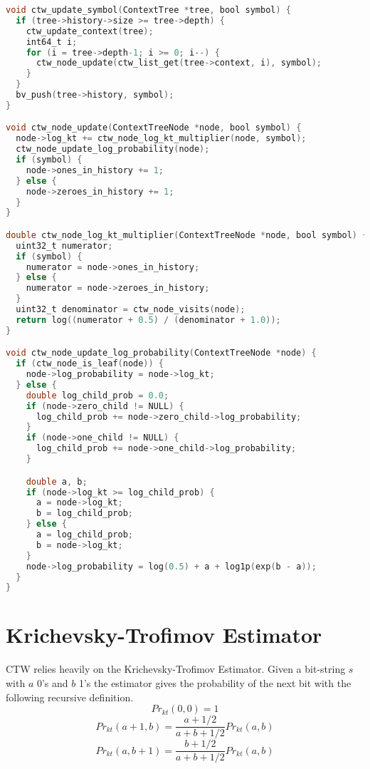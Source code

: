 \documentclass[fancychapters]{report}   	%
\begin{document}
\begin{lstlisting}[language=C]
void ctw_update_symbol(ContextTree *tree, bool symbol) {
  if (tree->history->size >= tree->depth) {
    ctw_update_context(tree);
    int64_t i;
    for (i = tree->depth-1; i >= 0; i--) {
      ctw_node_update(ctw_list_get(tree->context, i), symbol);
    }
  }
  bv_push(tree->history, symbol);
}

void ctw_node_update(ContextTreeNode *node, bool symbol) {
  node->log_kt += ctw_node_log_kt_multiplier(node, symbol);
  ctw_node_update_log_probability(node);
  if (symbol) {
    node->ones_in_history += 1;
  } else {
    node->zeroes_in_history += 1;
  } 
}

double ctw_node_log_kt_multiplier(ContextTreeNode *node, bool symbol) {
  uint32_t numerator;
  if (symbol) {
    numerator = node->ones_in_history;
  } else {
    numerator = node->zeroes_in_history;
  }
  uint32_t denominator = ctw_node_visits(node);
  return log((numerator + 0.5) / (denominator + 1.0));
}

void ctw_node_update_log_probability(ContextTreeNode *node) {
  if (ctw_node_is_leaf(node)) {
    node->log_probability = node->log_kt;
  } else {
    double log_child_prob = 0.0;
    if (node->zero_child != NULL) {
      log_child_prob += node->zero_child->log_probability;
    }
    if (node->one_child != NULL) {
      log_child_prob += node->one_child->log_probability;
    }

    double a, b;
    if (node->log_kt >= log_child_prob) {
      a = node->log_kt;
      b = log_child_prob;
    } else {
      a = log_child_prob;
      b = node->log_kt;
    }
    node->log_probability = log(0.5) + a + log1p(exp(b - a));
  }
}
\end{lstlisting}


\section{Krichevsky-Trofimov Estimator}
CTW relies heavily on the Krichevsky-Trofimov Estimator. Given a bit-string $s$ with $a$ 0's and $b$ 1's the estimator gives the probability of the next bit with the following recursive definition.
\begin{equation}
    Pr_{kt}(0,0) = 1
\end{equation}
\begin{equation}
    Pr_{kt}(a+1, b) = \frac{a+1/2}{a+b+1/2}Pr_{kt}(a,b)
\end{equation}
\begin{equation}
    Pr_{kt}(a, b+1) = \frac{b+1/2}{a+b+1/2}Pr_{kt}(a,b)
\end{equation}
\end{document}
